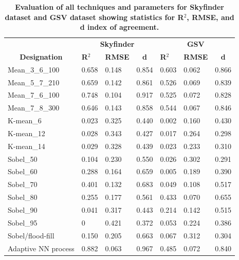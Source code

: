 \documentclass[final,3p,times,authoryear]{elsarticle}
\begin{document}
\begin{table}[!htbp]
\caption{\bf Evaluation of all techniques and parameters for Skyfinder dataset and GSV dataset showing statistics for R$^{2}$, RMSE, and d index of agreement. \label{tab:evalall}}     
\begin{tabular}{ l l l l l l l }
\multicolumn{1}{c}{\textbf{~}}
& \multicolumn{3}{c}{\textbf{Skyfinder}}
& \multicolumn{3}{c}{\textbf{GSV}}
\\ 
 \multicolumn{1}{c|}{\textbf{Designation}}
& \textbf{R$^{2}$} 
& \textbf{RMSE} 
& \multicolumn{1}{c|}{\textbf{d}}
& \textbf{R$^{2}$} 
& \textbf{RMSE}  
& \multicolumn{1}{c|}{\textbf{d}}
\\ \hline
Mean\_3\_6\_100	&0.658&0.148&0.854&0.603&0.062&0.866 \\
Mean\_5\_7\_210	&0.659&0.142&0.861&0.526&0.069&0.839 \\
Mean\_7\_6\_100	&0.748&0.104&0.917&0.525&0.072&0.828 \\
Mean\_7\_8\_300 &0.646&0.143&0.858&0.544&0.067&0.846  \\
K-mean\_6       &0.023&0.325&0.440&0.002&0.160&0.430 \\
K-mean\_12      &0.028&0.343&0.427&0.017&0.264&0.298 \\
K-mean\_14      &0.029&0.328&0.439&0.023&0.233&0.310 \\
Sobel\_50       &0.104&0.230&0.550&0.026&0.302&0.291 \\
Sobel\_60       &0.288&0.164&0.659&0.005&0.189&0.390 \\
Sobel\_70       &0.401&0.132&0.683&0.049&0.108&0.517 \\
Sobel\_80       &0.255&0.177&0.561&0.433&0.070&0.655 \\
Sobel\_90       &0.041&0.317&0.443&0.214&0.142&0.515 \\
Sobel\_95       &0    &0.421&0.372&0.053&0.224&0.386 \\
\hline
Sobel/flood-fill&0.150&0.205&0.663&0.067&0.312&0.304 \\
\hline
Adaptive NN process&0.882&0.063&0.967&0.485&0.072&0.840 \\
\hline
\end{tabular}
\end{table}
\end{document}
